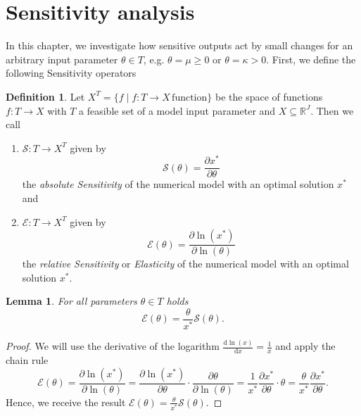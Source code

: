 \documentclass[a4paper, english, 11pt, onecolumn, oneside, final]{article}
\numberwithin{equation}{section}   %
\newcommand{\R}{\mathbb{R}}                 %
\theoremstyle{plain}
\newtheorem{lemma}      [theorem]{Lemma}
\theoremstyle{definition}
\newtheorem{definition} [theorem]{Definition}
\theoremstyle{remark}
\begin{document}
\section{Sensitivity analysis}\label{section:SensitivityAnalysis}
In this chapter, we investigate how sensitive outputs act by small changes for an arbitrary input parameter $\theta\in T$, e.g. $\theta=\mu\geq 0$ or $\theta=\kappa > 0$. First, we define the following Sensitivity operators
\begin{definition}
Let $X^T=\{f\mid f\colon T\to X\,\text{function}\}$ be the space of functions $f\colon T\to X$ with $T$ a feasible set of a model input parameter and $X\subseteq\R^J$. Then we call
\begin{enumerate}[\itshape(i)]
    \item $\mathcal{S}\colon T\to X^T$ given by
    \begin{equation*}
        \mathcal{S}(\theta)
        = \frac{\partial x^*}{\partial\theta}
    \end{equation*}
    the \emph{absolute Sensitivity} of the numerical model with an optimal solution $x^*$ and
    \item $\mathcal{E}\colon T\to X^T$ given by
    \begin{equation*}
        \mathcal{E}(\theta) = \frac{\partial\ln(x^*)}{\partial\ln(\theta)}
    \end{equation*}
    the \emph{relative Sensitivity} or \emph{Elasticity} of the numerical model with an optimal solution $x^*$.
\end{enumerate}
\end{definition}
\begin{lemma}
For all parameters $\theta\in T$ holds
    \begin{equation*}
        \mathcal{E}(\theta) = \frac{\theta}{x^*}\mathcal{S}(\theta).
    \end{equation*}
\end{lemma}
\begin{proof}
We will use the derivative of the logarithm $\frac{\mathrm{d}\ln(x)}{\mathrm{d}x}=\frac{1}{x}$ and apply the chain rule
    \begin{equation*}
        \mathcal{E}(\theta) 
        = \frac{\partial\ln(x^*)}{\partial\ln(\theta)}
        = \frac{\partial\ln(x^*)}{\partial\theta}\cdot\frac{\partial\theta}{\partial\ln(\theta)}
        = \frac{1}{x^*}\frac{\partial x^*}{\partial\theta}\cdot\theta
        = \frac{\theta}{x^*}\frac{\partial x^*}{\partial\theta}.
    \end{equation*}
    Hence, we receive the result $\mathcal{E}(\theta)=\frac{\theta}{x^*}\mathcal{S}(\theta)$.
\end{proof}
\end{document}
